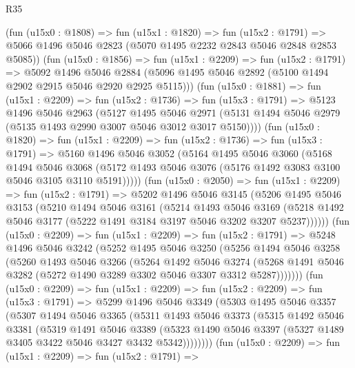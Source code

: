 \begin{lexlean}{R35}
\begin{coremodule}
    (fun (u15x0 : @1808) =>
    fun (u15x1 : @1820) =>
    fun (u15x2 : @1791) =>
    @5066 @1496 @5046 @2823 (@5070 @1495 @2232 @2843 @5046 @2848 @2853 @5085))
    (fun (u15x0 : @1856) =>
    fun (u15x1 : @2209) =>
    fun (u15x2 : @1791) =>
    @5092
      @1496
      @5046
      @2884
      (@5096 @1495 @5046 @2892 (@5100 @1494 @2902 @2915 @5046 @2920 @2925 @5115)))
    (fun (u15x0 : @1881) =>
    fun (u15x1 : @2209) =>
    fun (u15x2 : @1736) =>
    fun (u15x3 : @1791) =>
    @5123
      @1496
      @5046
      @2963
      (@5127
        @1495
        @5046
        @2971
        (@5131 @1494 @5046 @2979 (@5135 @1493 @2990 @3007 @5046 @3012 @3017 @5150))))
    (fun (u15x0 : @1820) =>
    fun (u15x1 : @2209) =>
    fun (u15x2 : @1736) =>
    fun (u15x3 : @1791) =>
    @5160
      @1496
      @5046
      @3052
      (@5164
        @1495
        @5046
        @3060
        (@5168
          @1494
          @5046
          @3068
          (@5172 @1493 @5046 @3076 (@5176 @1492 @3083 @3100 @5046 @3105 @3110 @5191)))))
    (fun (u15x0 : @2050) =>
    fun (u15x1 : @2209) =>
    fun (u15x2 : @1791) =>
    @5202
      @1496
      @5046
      @3145
      (@5206
        @1495
        @5046
        @3153
        (@5210
          @1494
          @5046
          @3161
          (@5214
            @1493
            @5046
            @3169
            (@5218 @1492 @5046 @3177 (@5222 @1491 @3184 @3197 @5046 @3202 @3207 @5237))))))
    (fun (u15x0 : @2209) =>
    fun (u15x1 : @2209) =>
    fun (u15x2 : @1791) =>
    @5248
      @1496
      @5046
      @3242
      (@5252
        @1495
        @5046
        @3250
        (@5256
          @1494
          @5046
          @3258
          (@5260
            @1493
            @5046
            @3266
            (@5264
              @1492
              @5046
              @3274
              (@5268 @1491 @5046 @3282 (@5272 @1490 @3289 @3302 @5046 @3307 @3312 @5287)))))))
    (fun (u15x0 : @2209) =>
    fun (u15x1 : @2209) =>
    fun (u15x2 : @2209) =>
    fun (u15x3 : @1791) =>
    @5299
      @1496
      @5046
      @3349
      (@5303
        @1495
        @5046
        @3357
        (@5307
          @1494
          @5046
          @3365
          (@5311
            @1493
            @5046
            @3373
            (@5315
              @1492
              @5046
              @3381
              (@5319
                @1491
                @5046
                @3389
                (@5323 @1490 @5046 @3397 (@5327 @1489 @3405 @3422 @5046 @3427 @3432 @5342))))))))
    (fun (u15x0 : @2209) =>
    fun (u15x1 : @2209) =>
    fun (u15x2 : @1791) =>

\end{coremodule}
\end{lexlean}
